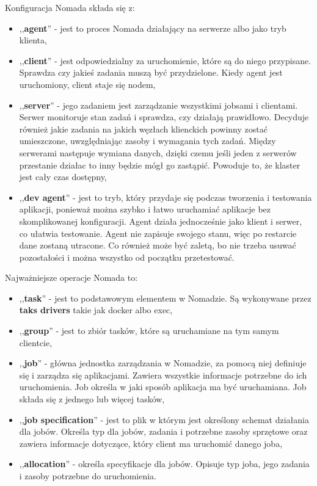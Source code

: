 \documentclass{iiuwb}
\begin{document}
Konfiguracja Nomada składa się z: 
\begin{itemize}
  \item ,,\textbf{agent}'' - jest to proces Nomada działający
  na serwerze albo jako tryb klienta,
  \item ,,\textbf{client}'' - jest odpowiedzialny za uruchomienie, 
  które są do niego przypisane. Sprawdza czy jakieś zadania 
  muszą być przydzielone. Kiedy agent jest uruchomiony, client
  staje się nodem,
  \item ,,\textbf{server}'' - jego zadaniem jest zarządzanie wszystkimi
  jobsami i clientami. Serwer monitoruje stan zadań i sprawdza, 
  czy działają prawidłowo. Decyduje również jakie zadania 
  na jakich węzłach klienckich powinny zostać umieszczone, 
  uwzględniając zasoby i wymagania tych zadań. Między serwerami
  następuje wymiana danych, dzięki czemu jeśli jeden z serwerów
  przestanie działac to inny będzie mógł go zastąpić. Powoduje to, 
  że klaster jest cały czas dostępny,
  \item ,,\textbf{dev agent}'' - jest to tryb, który przydaje 
  się podczas tworzenia i testowania aplikacji, ponieważ można 
  szybko i łatwo uruchamiać aplikacje bez skomplikowanej 
  konfiguracji. Agent działa jednocześnie jako klient i serwer,
  co ułatwia testowanie. Agent nie zapisuje swojego stanu, więc 
  po restarcie dane zostaną utracone. Co również może być zaletą, 
  bo nie trzeba usuwać pozostałości i można wszystko od początku 
  przetestować.
\end{itemize}


Najważniejsze operacje Nomada to:
\begin{itemize}
  \item ,,\textbf{task}'' - jest to podstawowym elementem w Nomadzie. 
  Są wykonywane przez \textbf{taks drivers} takie jak docker albo exec,
  \item ,,\textbf{group}'' - jest to zbiór tasków, które są uruchamiane 
  na tym samym clientcie,
  \item ,,\textbf{job}'' - główna jednostka zarządzania w Nomadzie, 
  za pomocą niej definiuje się i zarządza się aplikacjami. Zawiera wszystkie 
  informacje potrzebne do ich uruchomienia. Job określa w jaki sposób 
  aplikacja ma być uruchamiana. Job składa się z jednego lub więcej tasków,
  \item ,,\textbf{job specification}'' - jest to plik w którym jest określony 
  schemat działania dla jobów. Określa typ dla jobów, zadania i potrzebne 
  zasoby sprzętowe oraz zawiera informacje dotyczące, który client ma uruchomić 
  danego joba,
  \item ,,\textbf{allocation}'' - określa specyfikacje dla jobów. Opisuje typ joba, 
  jego zadania i zasoby potrzebne do uruchomienia.
\end{itemize}
\end{document}
